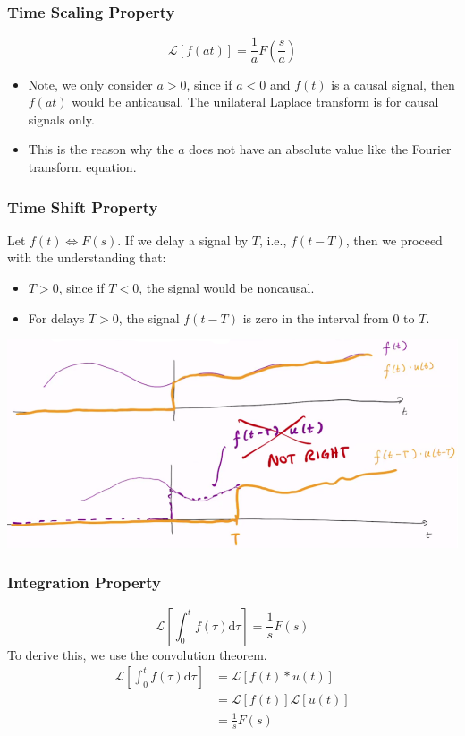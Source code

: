 \documentclass[10pt]{article}
\newcommand{\llra}{\Longleftrightarrow}
\newcommand{\laplace}{\mathcal{L}}
\newcommand{\dd}{\text{d}}
\begin{document}
\subsubsection*{Time Scaling Property}
\[\boxed{\laplace[f(at)] = \frac{1}{a} F\left(\frac{s}{a}\right)}\]
\begin{itemize}
    \item Note, we only consider $a > 0$, since if $a < 0$ and $f(t)$ is a causal signal, then $f(at)$ would be anticausal.  The unilateral Laplace transform is for causal signals only.
    \item This is the reason why the $a$ does not have an absolute value like the Fourier transform equation.
\end{itemize}
\subsubsection*{Time Shift Property}
Let $f(t) \llra F(s)$.  If we delay a signal by $T$, i.e., $f(t - T)$, then we proceed with the understanding that:
\begin{itemize}
    \item $T > 0$, since if $T < 0$, the signal would be noncausal.
    \item For delays $T > 0$, the signal $f(t - T)$ is zero in the interval from $0$ to $T$.
\end{itemize}
\begin{center}
    \includegraphics*[scale=0.6]{W9_2.png}
\end{center}

\subsubsection*{Integration Property}
\[\boxed{\laplace\left[\int_0^t f(\tau) \dd \tau\right] = \frac{1}{s} F(s)}\]
To derive this, we use the convolution theorem.
\begin{align*}
    \laplace\left[\int_0^t f(\tau) \dd \tau\right] &= \laplace[f(t) * u(t)]\\
    &= \laplace[f(t)] \laplace[u(t)]\\
    &= \frac{1}{s} F(s)
\end{align*}
\end{document}
